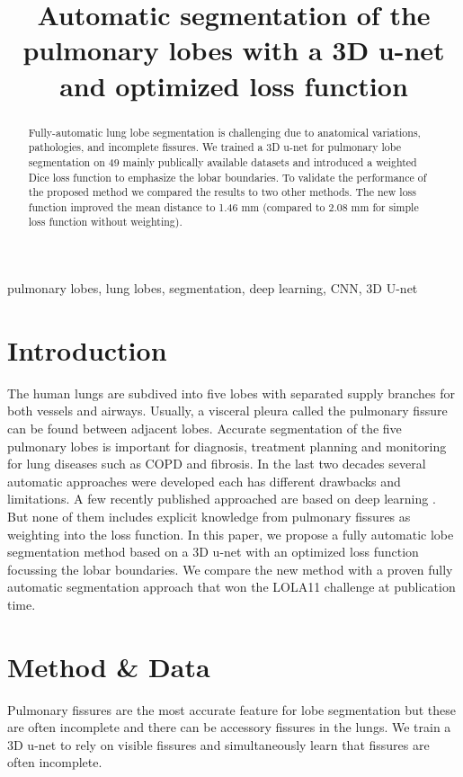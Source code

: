 \documentclass{midl} %
\title[Automatic segmentation of the pulmonary lobes with a 3D u-net]{Automatic segmentation of the pulmonary lobes with a 3D u-net and optimized loss function}
\begin{document}
\maketitle

\begin{abstract}
Fully-automatic lung lobe segmentation is challenging due to anatomical variations, pathologies, and incomplete fissures.
We trained a 3D u-net for pulmonary lobe segmentation on 49 mainly publically available datasets and 
introduced a weighted Dice loss function to emphasize the lobar boundaries. To validate the performance of the proposed method we compared the results to two other methods. The new loss function improved the mean distance to 1.46 mm (compared to 2.08 mm for simple loss function without weighting).  
\end{abstract}

\begin{keywords}
pulmonary lobes, lung lobes, segmentation, deep learning, CNN, 3D U-net 
\end{keywords}

\section{Introduction}
The human lungs are subdived into five lobes with separated supply branches for both vessels and airways. 
Usually, a visceral pleura called the pulmonary fissure can be found between adjacent lobes.
Accurate segmentation of the five pulmonary lobes is important for diagnosis, treatment planning and monitoring for lung diseases such as COPD and fibrosis.
In the last two decades several automatic approaches were developed \cite{doel2015} each has different drawbacks and limitations. A few recently published approached are based on deep learning \cite{gerard2019, wang2019,tang2019,park2019,lee2019,imran2018,george2017}. But none of them includes explicit knowledge from pulmonary fissures as weighting into the loss function. 
In this paper, we propose a fully automatic lobe segmentation method based on a 3D u-net with an optimized loss function focussing the lobar boundaries.
We compare the new method with a proven fully automatic segmentation approach \cite{lassen2013} that won the LOLA11 challenge \cite{LOLA11} at publication time. 



\section{Method \& Data}
Pulmonary fissures are the most accurate feature for lobe segmentation but these are often incomplete and there can be accessory fissures in the lungs. 
We train a 3D u-net to rely on visible fissures and simultaneously learn that fissures are often incomplete. 
\end{document}
